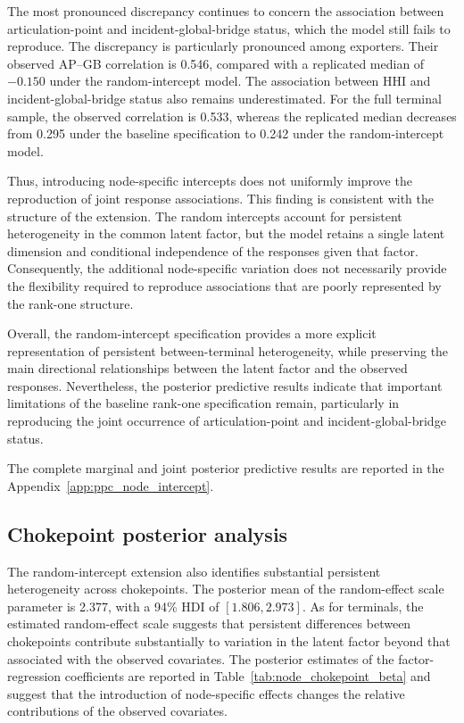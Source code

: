 \documentclass[pdftex,12pt,openright,a4paper,oneside]{book}
\begin{document}
The most pronounced discrepancy continues to concern the association
between articulation-point and incident-global-bridge status, which the model still
fails to reproduce.
The discrepancy is particularly
pronounced among exporters.
Their observed AP--GB correlation
is 0.546, compared with a replicated
median of $-0.150$ under the
random-intercept model.
The association between HHI and
incident-global-bridge status also
remains underestimated.
For the full terminal sample,
the observed correlation is 0.533,
whereas the replicated median
decreases from 0.295 under the
baseline specification to 0.242
under the random-intercept model.

Thus, introducing node-specific
intercepts does not uniformly
improve the reproduction of joint
response associations.
This finding is consistent with
the structure of the extension.
The random intercepts account for
persistent heterogeneity in the
common latent factor, but the
model retains a single latent
dimension and conditional
independence of the responses
given that factor.
Consequently, the additional
node-specific variation does not
necessarily provide the flexibility
required to reproduce associations
that are poorly represented by
the rank-one structure.

Overall, the random-intercept
specification provides a more
explicit representation of persistent
between-terminal heterogeneity,
while preserving the main directional
relationships between the latent
factor and the observed responses.
Nevertheless, the posterior predictive
results indicate that important
limitations of the baseline rank-one
specification remain, particularly
in reproducing the joint occurrence
of articulation-point and
incident-global-bridge status.

The complete marginal and joint
posterior predictive results are
reported in the Appendix~\ref{app:ppc_node_intercept}.

\subsection{Chokepoint posterior analysis}
\label{subsec:node_chokepoint_results}

The random-intercept extension also
identifies substantial persistent
heterogeneity across chokepoints.
The posterior mean of the random-effect
scale parameter is 2.377, with a 94\%
HDI of $[1.806,2.973]$.
As for terminals, the estimated
random-effect scale suggests that
persistent differences between
chokepoints contribute substantially
to variation in the latent factor
beyond that associated with the
observed covariates.
The posterior estimates of the
factor-regression coefficients
are reported in
Table~\ref{tab:node_chokepoint_beta} and suggest that the
introduction of node-specific effects
changes the relative contributions
of the observed covariates.
\end{document}
